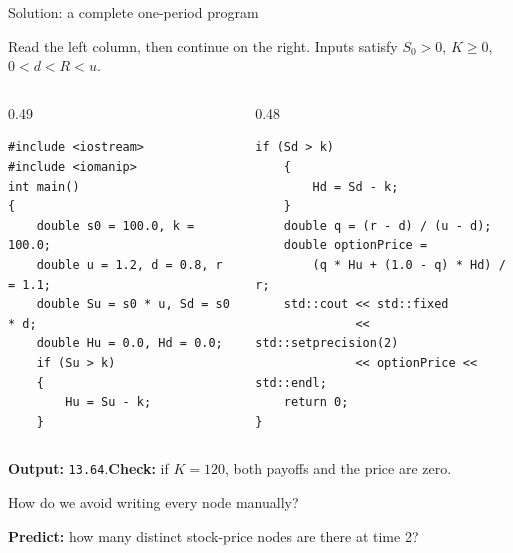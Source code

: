 \documentclass[10pt,aspectratio=169]{beamer}
\begin{document}
\begin{frame}[fragile]{Solution: a complete one-period program}
\relax

{\small Read the left column, then continue on the right. Inputs satisfy $S_0>0$, $K\geq0$, $0<d<R<u$.}
\begin{columns}[T,onlytextwidth]
\begin{column}{0.49\textwidth}
\begin{lstlisting}[basicstyle=\ttfamily\fontsize{8.5}{10}\selectfont]
#include <iostream>
#include <iomanip>
int main()
{
    double s0 = 100.0, k = 100.0;
    double u = 1.2, d = 0.8, r = 1.1;
    double Su = s0 * u, Sd = s0 * d;
    double Hu = 0.0, Hd = 0.0;
    if (Su > k)
    {
        Hu = Su - k;
    }
\end{lstlisting}
\end{column}
\begin{column}{0.48\textwidth}
\begin{lstlisting}[basicstyle=\ttfamily\fontsize{8.5}{10}\selectfont]
    if (Sd > k)
    {
        Hd = Sd - k;
    }
    double q = (r - d) / (u - d);
    double optionPrice =
        (q * Hu + (1.0 - q) * Hd) / r;
    std::cout << std::fixed
              << std::setprecision(2)
              << optionPrice << std::endl;
    return 0;
}
\end{lstlisting}
\end{column}
\end{columns}
\textbf{Output:} \texttt{13.64}.\quad \textbf{Check:} if $K=120$, both payoffs and the price are zero.

\end{frame}

\begin{frame}{How do we avoid writing every node manually?}
\relax

\begin{center}
\end{center}
\textbf{Predict:} how many distinct stock-price nodes are there at time 2?

\end{frame}
\end{document}
